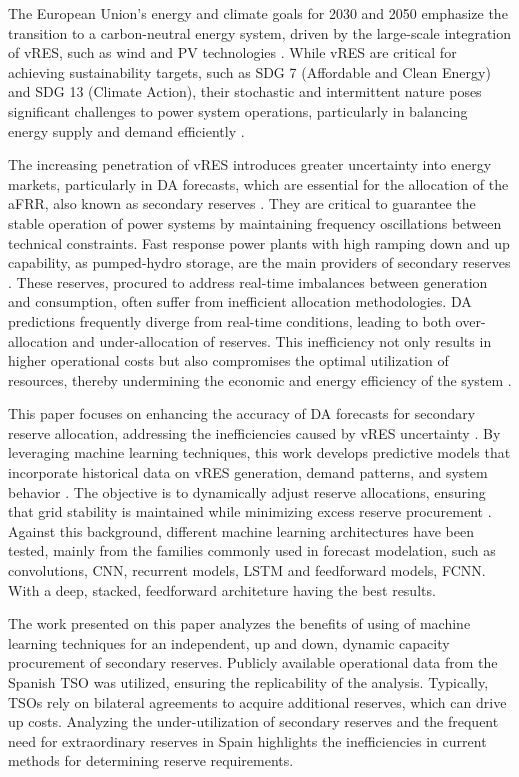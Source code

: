 The European Union's energy and climate goals for 2030 and 2050 emphasize the transition to a carbon-neutral energy system, driven by the large-scale integration of \gls{vRES}, such as wind and \gls{PV} technologies \cite{Franc:21,Perissi2022,Dobrowolski:22}. While \gls{vRES} are critical for achieving sustainability targets, such as \gls{SDG} 7 (Affordable and Clean Energy) and \gls{SDG} 13 (Climate Action), their stochastic and intermittent nature poses significant challenges to power system operations, particularly in balancing energy supply and demand efficiently \cite{Ocker2017,Frade2019_wind}.  \par
The increasing penetration of \gls{vRES} introduces greater uncertainty into energy markets, particularly in \gls{DA} forecasts, which are essential for the allocation of the \gls{aFRR}, also known as secondary reserves \cite{Algarvio:19c,Skytte:19}. They are critical to guarantee the stable operation of power systems by maintaining frequency oscillations between technical constraints. Fast response power plants with high ramping down and up capability, as pumped-hydro storage, are the main providers of secondary reserves \cite{Algarvio:20}. These reserves, procured to address real-time imbalances between generation and consumption, often suffer from inefficient allocation methodologies. \gls{DA} predictions frequently diverge from real-time conditions, leading to both over-allocation and under-allocation of reserves. This inefficiency not only results in higher operational costs but also compromises the optimal utilization of resources, thereby undermining the economic and energy efficiency of the system \cite{Algarvio:24,Frade:19c}.\par
This paper focuses on enhancing the accuracy of \gls{DA} forecasts for secondary reserve allocation, addressing the inefficiencies caused by \gls{vRES} uncertainty \cite{Algarvio:19b,Knorr:19}. By leveraging machine learning techniques, this work develops predictive models that incorporate historical data on \gls{vRES} generation, demand patterns, and system behavior \cite{DeVos2019,Kruse2022} . The objective is to dynamically adjust reserve allocations, ensuring that grid stability is maintained while minimizing excess reserve procurement \cite{Algarvio:24,Algarvio2024}. 
\textcolor[rgb]{0,0,0.5}{Against this background, different machine learning architectures have been tested, mainly from the families commonly used in forecast modelation, such as convolutions, \gls{CNN}, recurrent models, \gls{LSTM} and feedforward models, \gls{FCNN}. With a deep, stacked, feedforward architeture having the best results.}\par
The work presented on this paper analyzes the benefits of using of machine learning techniques for an independent, up and down, dynamic capacity procurement of secondary reserves. Publicly available operational data from the Spanish \gls{TSO} was utilized, ensuring the replicability of the analysis. Typically, \gls{TSO}s rely on bilateral agreements to acquire additional reserves, which can drive up costs. Analyzing the under-utilization of secondary reserves and the frequent need for extraordinary reserves in Spain highlights the inefficiencies in current methods for determining reserve requirements. 


